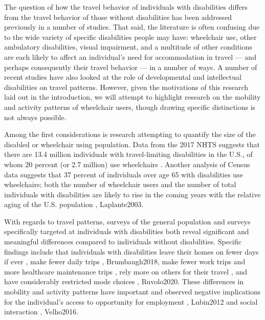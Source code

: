 \documentclass[3p, authoryear, review]{elsarticle} %
\begin{document}
The question of how the travel behavior of individuals with disabilities differs
from the travel behavior of those without disabilities has been addressed
previously in a number of studies. That said, the literature is often confusing
due to the wide variety of specific disabilities people may have: wheelchair use,
other ambulatory disabilities, visual impairment, and a multitude of other
conditions are each likely to affect an individual's need for accommodation in
travel --- and perhaps consequently their travel behavior --- in a number of ways.
A number of recent studies have also looked at the role of developmental \citet{Wasfi2007}
and intellectual \citet{Feeley2019} disabilities on travel patterns. However,
given the motivations of this research laid out in the introduction, we will attempt to highlight
research on the mobility and activity patterns of wheelchair users, though
drawing specific distinctions is not always possible.

Among the first considerations is research attempting to quantify the size
of the disabled or wheelchair using population. Data from the 2017 NHTS
suggests that there are 13.4 million individuals with travel-limiting disabilities
in the U.S., of whom 20 percent (or 2.7 million) use wheelchairs \citet{Brumbaugh2018}.
Another analysis of Census data suggests that 37 percent of individuals over
age 65 with disabilities use wheelchairs; both the number of wheelchair users
and the number of total individuals with disabilities are likely to rise
in the coming years with the relative aging of the U.S. population \citet{Sweeney2004}, Laplante2003.

With regards to travel patterns, surveys of the general population and surveys
specifically targeted at individuals with disabilities both reveal significant and
meaningful differences compared to individuals without disabilities. Specific
findings include that individuals with disabilities leave their homes on fewer
days if ever \citet{Sweeney2004}, make fewer daily trips
\citet{Schmocker2005}, Brumbaugh2018, make fewer work trips and more
healthcare maintenance trips \citet{Ermagun2016}, rely more on others for their travel \citet{Sweeney2004},
and have considerably restricted mode
choices \citet{Rosenbloom2007}, Ruvolo2020. These differences in mobility and activity patterns
have important and observed negative implications for the individual's access to
opportunity for employment \citet{Rosenbloom2007}, Lubin2012 and social interaction
\citet{Bascom2017}, Velho2016.
\end{document}
